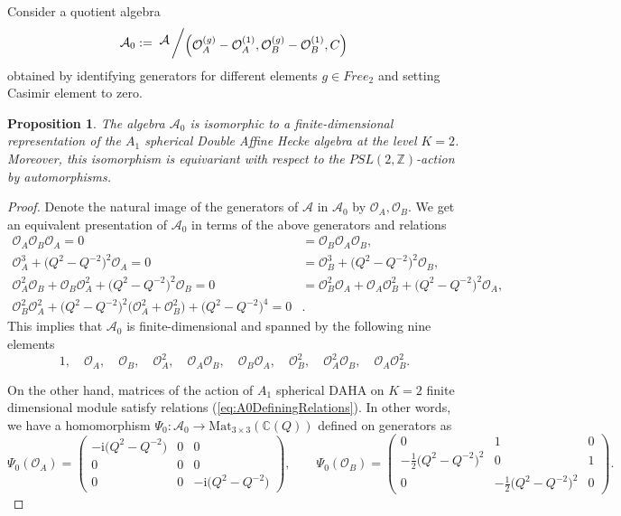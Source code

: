 \documentclass{amsart}
\newtheorem{proposition}[theorem]{Proposition}
\newcommand{\Oa}{\mathcal O_A}
\newcommand{\Ob}{\mathcal O_B}
\newcommand{\bigslant}[2]{{\raisebox{.2em}{$#1$}\left/\raisebox{-.2em}{$#2$}\right.}}
\begin{document}
Consider a quotient algebra
\begin{equation*}
\mathcal A_0:=\;\bigslant{\mathcal A}{\Big(\Oa^{(g)}-\Oa^{(1)},\Ob^{(g)}-\Ob^{(1)},C\Big)}
\end{equation*}
obtained by identifying generators for different elements $g\in Free_2$ and setting Casimir element to zero.

\begin{proposition}
The algebra $\mathcal A_0$ is isomorphic to a finite-dimensional representation of the $A_1$ spherical Double Affine Hecke algebra at the level $K=2$. Moreover, this isomorphism is equivariant with respect to the $PSL(2,\mathbb Z)$-action by automorphisms.
\end{proposition}
\begin{proof}
Denote the natural image of the generators of $\mathcal A$ in $\mathcal A_0$ by $\Oa,\Ob$. We get an equivalent presentation of $\mathcal A_0$ in terms of the above generators and relations
\begin{equation}
\begin{aligned}
\Oa\Ob\Oa=0&=\Ob\Oa\Ob,\\
\Oa^3+\big(Q^2-Q^{-2}\big)^2\Oa=0&=\Ob^3+\big(Q^2-Q^{-2}\big)^2\Ob,\\
\Oa^2\Ob+\Ob\Oa^2+\big(Q^2-Q^{-2}\big)^2\Ob=0&=\Ob^2\Oa+\Oa\Ob^2+\big(Q^2-Q^{-2}\big)^2\Oa,\\
\Ob^2\Oa^2+\big(Q^2-Q^{-2}\big)^2\big(\Oa^2+\Ob^2\big)+\big(Q^2-Q^{-2}\big)^4=0&.
\end{aligned}
\label{eq:A0DefiningRelations}
\end{equation}
This implies that $\mathcal A_0$ is finite-dimensional and spanned by the following nine elements
\begin{equation}
1,\quad \Oa,\quad \Ob,\quad \Oa^2,\quad \Oa\Ob,\quad \Ob\Oa,\quad \Ob^2,\quad \Oa^2\Ob,\quad \Oa\Ob^2.
\label{eq:A0SpanningSet}
\end{equation}

On the other hand, matrices of the action of $A_1$ spherical DAHA on $K=2$ finite dimensional module \cite{Cherednik'2005} satisfy relations (\ref{eq:A0DefiningRelations}). In other words, we have a homomorphism $\Psi_0:\mathcal A_0\rightarrow\mathrm{Mat}_{3\times3}(\mathbb C(Q))$ defined on generators as
\begin{equation*}
\Psi_0(\Oa)=\left(\begin{array}{ccc}
-\mathrm i \big(Q^{2}-Q^{-2}\big) & 0 & 0 \\
0 & 0 & 0 \\
0 & 0 & -\mathrm i \big(Q^2-Q^{-2}\big)
\end{array}\right),
\qquad
\Psi_0(\Ob)=\left(\begin{array}{ccc}
0 & 1 & 0 \\
-\frac12\big(Q^2-Q^{-2}\big)^2  & 0 & 1 \\
0 & -\frac12\big(Q^2-Q^{-2}\big)^2 & 0
\end{array}\right).
\end{equation*}


\end{proof}
\end{document}
